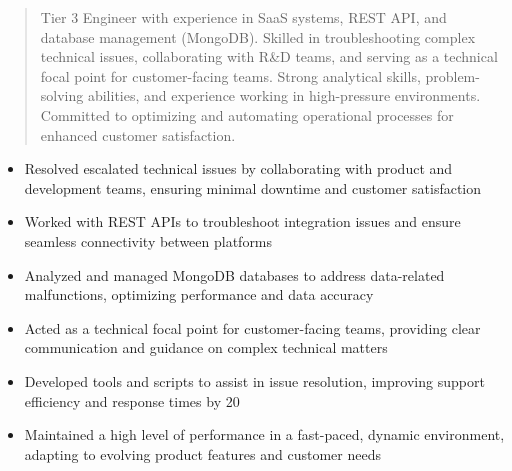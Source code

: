 



\makecvheader

\begin{quote}
  \noindent
  Tier 3 Engineer with experience in SaaS systems, REST API, and database management (MongoDB). Skilled in troubleshooting complex technical issues, collaborating with R&D teams, and serving as a technical focal point for customer-facing teams. Strong analytical skills, problem-solving abilities, and experience working in high-pressure environments. Committed to optimizing and automating operational processes for enhanced customer satisfaction.
\end{quote}

\par\smallskip
\noindent
\begin{minipage}{20cm}
  \begin{minipage}{9.75cm}
    \begin{itemize}
      \item Resolved escalated technical issues by collaborating with product and development teams, ensuring minimal downtime and customer satisfaction
      \item Worked with REST APIs to troubleshoot integration issues and ensure seamless connectivity between platforms
      \item Analyzed and managed MongoDB databases to address data-related malfunctions, optimizing performance and data accuracy
    \end{itemize}
  \end{minipage}
  \hfill
  \begin{minipage}{9.75cm}
    \begin{itemize}
      \item Acted as a technical focal point for customer-facing teams, providing clear communication and guidance on complex technical matters
      \item Developed tools and scripts to assist in issue resolution, improving support efficiency and response times by 20%
      \item Maintained a high level of performance in a fast-paced, dynamic environment, adapting to evolving product features and customer needs
    \end{itemize}
  \end{minipage}
\end{minipage}
\par\smallskip
\divider


